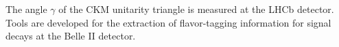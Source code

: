 The angle $\gamma$ of the CKM unitarity triangle is measured at the
LHCb detector.
Tools are developed for the extraction of flavor-tagging information
for signal decays at the Belle II detector.